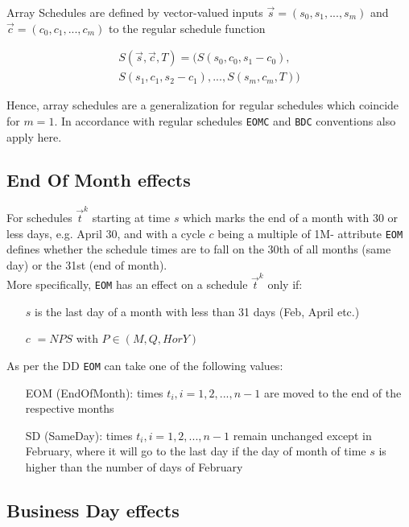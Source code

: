 \documentclass[9pt,oneside]{amsart}
\newcommand{\attr}[1]{\texttt{#1}}
\newcommand{\sdl}[3]{S(#1,#2,#3)}
\begin{document}
\begin{multicols}{2}
Array Schedules are defined by vector-valued inputs $\vec{s}=(s_0,s_1,...,s_m)$ and $\vec{c}=(c_0,c_1,...,c_m)$ to the regular schedule function

\begin{multline*}
	\sdl{\vec{s}}{\vec{c}}{T} = (\sdl{s_0}{c_0}{s_1-c_0},\\
					\sdl{s_1}{c_1}{s_2-c_1},...,\sdl{s_m}{c_m}{T})
\end{multline*}


Hence, array schedules are a generalization for regular schedules which coincide for $m=1$. In accordance with regular schedules \attr{EOMC} and \attr{BDC} conventions also apply here.


\subsection{End Of Month effects}

For schedules $\vec{t}^k$ starting at time $s$ which marks the end of a month with 30 or less days, e.g. April 30, and with a cycle $c$ being a multiple of 1M- attribute \attr{EOM} defines whether the schedule times are to fall on the 30th of all months (same day) or the 31st (end of month).\\ 

More specifically, \attr{EOM} has an effect on a schedule $\vec{t}^k$ only if:

\begin{itemize}
	\item[$s$] is the last day of a month with less than 31 days (Feb, April etc.)

	\item[$c$] $=NPS$ with $P\in(M, Q, H or Y)$
\end{itemize}

As per the DD \attr{EOM} can take one of the following values:
\begin{itemize}
	\item[EOM] (EndOfMonth): times $t_i,i=1,2,...,n-1$ are moved to the end of the respective months

	\item[SD] (SameDay): times $t_i,i=1,2,...,n-1$ remain unchanged except in February, where it will go to the last day if the day of month of time $s$ is higher than the number of days of February
\end{itemize}


\subsection{Business Day effects}


\end{multicols}
\end{document}

